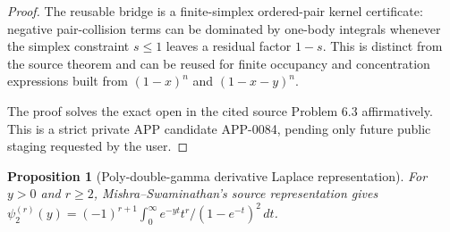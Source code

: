 \documentclass[11pt]{article}
\numberwithin{equation}{section}
\newtheorem{proposition}[theorem]{Proposition}
\theoremstyle{definition}
\theoremstyle{remark}
\newcommand{\1}{\mathbf 1}
\begin{document}
\begin{proof}
The reusable bridge is a finite-simplex ordered-pair kernel certificate: negative pair-collision terms can be dominated by one-body integrals whenever the simplex constraint \(s\le1\) leaves a residual factor \(1-s\). This is distinct from the source theorem and can be reused for finite occupancy and concentration expressions built from \((1-x)^n\) and \((1-x-y)^n\).

The proof solves the exact open in the cited source Problem 6.3 affirmatively. This is a strict private APP candidate APP-0084, pending only future public staging requested by the user.
\end{proof}

\begin{proposition}[Poly-double-gamma derivative Laplace representation]
\label{res:polydoublegamma-derivative-laplace-representation}
For \(y>0\) and \(r\ge2\), Mishra--Swaminathan's source representation gives \(\psi_2^{(r)}(y)=(-1)^{r+1}\int_0^\infty e^{-yt}t^r/(1-e^{-t})^2\,dt\).
\end{proposition}
\end{document}
